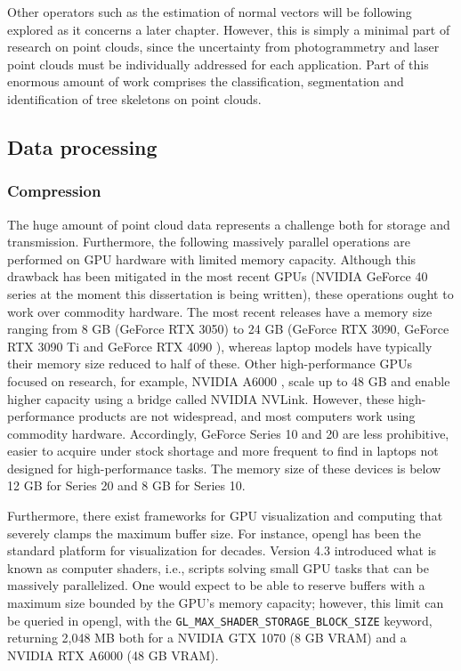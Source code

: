 Other operators such as the estimation of normal vectors will be following explored as it concerns a later chapter. However, this is simply a minimal part of research on point clouds, since the uncertainty from photogrammetry and laser point clouds must be individually addressed for each application. Part of this enormous amount of work comprises the classification, segmentation and identification of tree skeletons \cite{cardenas_reconstruction_2022} on point clouds. 

\subsection{Data processing}

\subsubsection{Compression}

The huge amount of point cloud data represents a challenge both for storage and transmission. Furthermore, the following massively parallel operations are performed on GPU hardware with limited memory capacity. Although this drawback has been mitigated in the most recent GPUs (NVIDIA GeForce 40 series at the moment this dissertation is being written), these operations ought to work over commodity hardware. The most recent releases have a memory size ranging from 8 GB (GeForce RTX 3050) to 24 GB (GeForce RTX 3090, GeForce RTX 3090 Ti \cite{nvidia_nvidia_nodate-2} and GeForce RTX 4090 \cite{nvidia_nvidia_nodate-1}), whereas laptop models have typically their memory size reduced to half of these. Other high-performance GPUs focused on research, for example, NVIDIA A6000 \cite{nvidia_nvidia_nodate}, scale up to 48 GB and enable higher capacity using a bridge called NVIDIA NVLink. However, these high-performance products are not widespread, and most computers work using commodity hardware. Accordingly, GeForce Series 10 and 20 are less prohibitive, easier to acquire under stock shortage and more frequent to find in laptops not designed for high-performance tasks. The memory size of these devices is below 12 GB for Series 20 and 8 GB for Series 10. 

Furthermore, there exist frameworks for GPU visualization and computing that severely clamps the maximum buffer size. For instance, \acrshort{opengl} has been the standard platform for visualization for decades. Version 4.3 introduced what is known as computer shaders, i.e., scripts solving small GPU tasks that can be massively parallelized. One would expect to be able to reserve buffers with a maximum size bounded by the GPU's memory capacity; however, this limit can be queried in \acrshort{opengl}, with the \scriptsize \verb|GL_MAX_SHADER_STORAGE_BLOCK_SIZE| \normalsize keyword, returning 2,048 MB both for a NVIDIA GTX 1070 (8 GB VRAM) and a NVIDIA RTX A6000 (48 GB VRAM).

